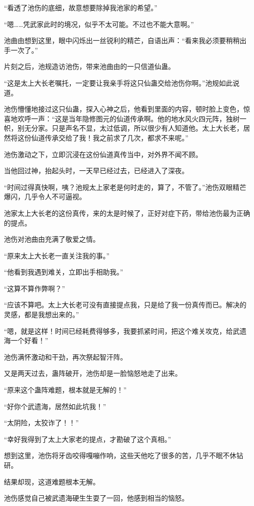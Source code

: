 \begin{this_body}
“看透了池伤的底细，故意想要除掉我池家的希望。”

“嗯……凭武家此时的境况，似乎不太可能。不过也不能大意啊。”

池曲由想到这里，眼中闪烁出一丝锐利的精芒，自语出声：“看来我必须要稍稍出手一次了。”

片刻之后，池规造访池伤，带来池曲由的一只信道仙蛊。

“这是太上大长老嘱托，一定要让我亲手将这只仙蛊交给池伤你啊。”池规如此说道。

池伤懵懂地接过这只仙蛊，探入心神之后，他看到里面的内容，顿时脸上变色，惊喜地欢呼一声：“这是当年隐修图元的仙道传承啊。他的地水风火四元阵，独树一帜，别无分家。只是声名不显，太过低调，所以很少有人知道他。太上大长老，居然将这份仙道传承交给了我！我之前求了几次，都求不来呢。”

池伤激动之下，立即沉浸在这份仙道真传当中，对外界不闻不顾。

当他回过神，抬起头时，一天早已经过去，已经进入了深夜。

“时间过得真快啊，咦？池规太上家老是何时走的，算了，不管了。”池伤双眼精芒爆闪，几乎令人不可逼视。

池家太上大长老的这份真传，来的太是时候了，正好对症下药，带给池伤最为正确的提点。

池伤对池曲由充满了敬爱之情。

“原来太上大长老一直关注我的事。”

“他看到我遇到难关，立即出手相助我。”

“这算不算作弊啊？”

“应该不算吧。太上大长老可没有直接提点我，只是给了我一份真传而已。解决的灵感，都是我想出来的。”

“嗯，就是这样！时间已经耗费得够多，我要抓紧时间，把这个难关攻克，给武遗海一个好看！”

池伤满怀激动和干劲，再次祭起智汗阵。

又是两天过去，蛊阵破开，池伤却是一脸恼怒地走了出来。

“原来这个蛊阵难题，根本就是无解的！”

“好你个武遗海，居然如此坑我！”

“太阴险，太狡诈了！！”

“幸好我得到了太上大家老的提点，才勘破了这个真相。”

想到这里，池伤将牙齿咬得嘎嘣作响，这些天他吃了很多的苦，几乎不眠不休钻研。

结果却现，这道难题根本无解。

池伤感觉自己被武遗海硬生生耍了一回，他感到相当的恼怒。


\end{this_body}
